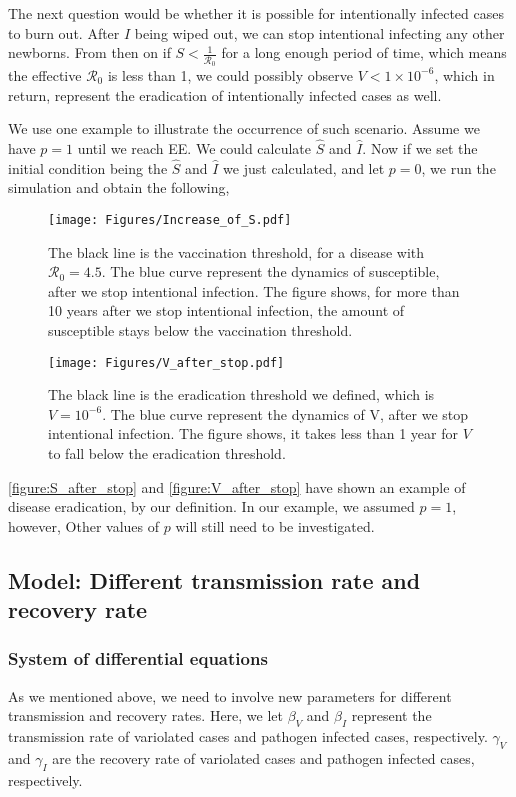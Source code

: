 \documentclass[12pt]{article}
\newcommand{\R}{\mathcal{R}}
\begin{document}
The next question would be whether it is possible for intentionally infected cases to burn out. After $I$ being wiped out, we can stop intentional infecting any other newborns. From then on if $S<\frac{1}{\R_0}$ for a long enough period of time, which means the effective $\R_0$ is less than 1, we could possibly observe $V<1\times10^{-6}$, which in return, represent the eradication of intentionally infected cases as well.

We use one example to illustrate the occurrence of such scenario. Assume we have $p=1$ until we reach EE. We could calculate $\hat{S}$ and $\hat{I}$. Now if we set the initial condition being the $\hat{S}$ and $\hat{I}$ we just calculated, and let $p=0$, we run the simulation and obtain the following,
\begin{figure}[H]
  \centering
  \texttt{[image: Figures/Increase\_of\_S.pdf]}
  \caption{The black line is the vaccination threshold, for a disease with $\R_0=4.5$. The blue curve represent the dynamics of susceptible, after we stop intentional infection. The figure shows, for more than 10 years after we stop intentional infection, the amount of susceptible stays below the vaccination threshold.}
\label{figure:S_after_stop}
\end{figure}

\begin{figure}[H]
  \centering
  \texttt{[image: Figures/V\_after\_stop.pdf]}
  \caption{The black line is the eradication threshold we defined, which is $V=10^{-6}$. The blue curve represent the dynamics of V, after we stop intentional infection. The figure shows, it takes less than 1 year for $V$ to fall below the eradication threshold.}
\label{figure:V_after_stop}
\end{figure}

\autoref{figure:S_after_stop} and \autoref{figure:V_after_stop} have shown an example of disease eradication, by our definition. In our example, we assumed $p=1$, however, Other values of $p$ will still need to be investigated.

\subsection{Model: Different transmission rate and recovery rate}
\subsubsection{System of differential equations}
As we mentioned above, we need to involve new parameters for different transmission and recovery rates. Here, we let $\beta_V$ and $\beta_I$ represent the transmission rate of variolated cases and pathogen infected cases, respectively. $\gamma_V$ and $\gamma_I$ are the recovery rate of variolated cases and pathogen infected cases, respectively.
\end{document}

